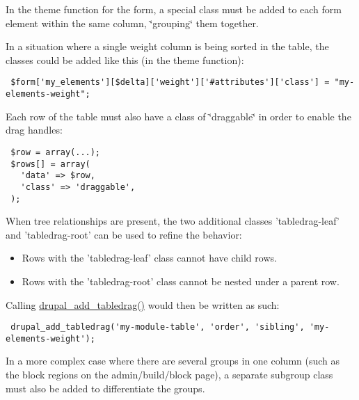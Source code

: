 In the theme function for the form, a special class must be added to each form element within the same column, \char`\"{}grouping\char`\"{} them together.

In a situation where a single weight column is being sorted in the table, the classes could be added like this (in the theme function): 

\begin{Code}\begin{verbatim} $form['my_elements'][$delta]['weight']['#attributes']['class'] = "my-elements-weight";
\end{verbatim}
\end{Code}



Each row of the table must also have a class of \char`\"{}draggable\char`\"{} in order to enable the drag handles: 

\begin{Code}\begin{verbatim} $row = array(...);
 $rows[] = array(
   'data' => $row,
   'class' => 'draggable',
 );
\end{verbatim}
\end{Code}



When tree relationships are present, the two additional classes 'tabledrag-leaf' and 'tabledrag-root' can be used to refine the behavior:\begin{itemize}
\item Rows with the 'tabledrag-leaf' class cannot have child rows.\item Rows with the 'tabledrag-root' class cannot be nested under a parent row.\end{itemize}


Calling \hyperlink{common_8inc_b905af5d90a84b5d48f3a517992875f5}{drupal\_\-add\_\-tabledrag()} would then be written as such: 

\begin{Code}\begin{verbatim} drupal_add_tabledrag('my-module-table', 'order', 'sibling', 'my-elements-weight');
\end{verbatim}
\end{Code}



In a more complex case where there are several groups in one column (such as the block regions on the admin/build/block page), a separate subgroup class must also be added to differentiate the groups. 


